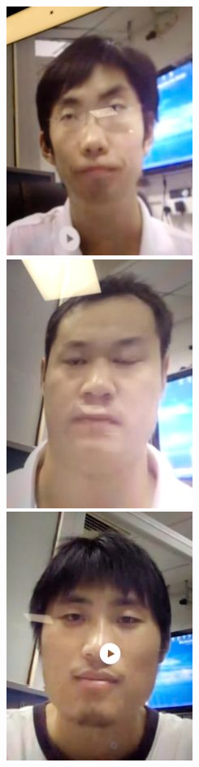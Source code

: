 \begin{figure}[H]
    \subfloat
        {\hspace{0.7cm}\includegraphics[scale = 0.12]{figures/004.jpg}\hspace{1.5cm}}
    \subfloat
        {\includegraphics[scale = 0.12]{figures/101.jpg}\hspace{4.3cm}}
    \subfloat
        {\includegraphics[scale = 0.12]{figures/198.jpg}\hspace{0.1cm}}

\end{figure}

